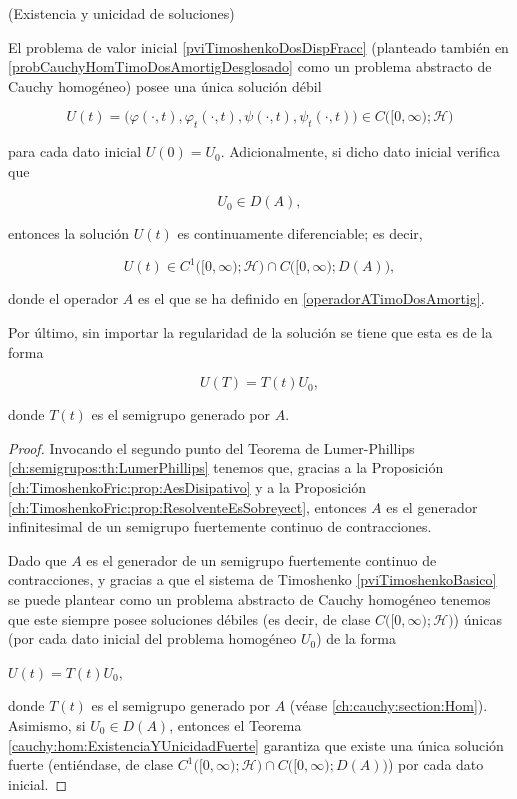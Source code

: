 \begin{Teorema}{(Existencia y unicidad de soluciones)}
    \label{ch:TimoshenkoFric:prop:existenciaYUnicidad}
    
    El problema de valor inicial \eqref{pviTimoshenkoDosDispFracc} (planteado también en \eqref{probCauchyHomTimoDosAmortigDesglosado} como un problema abstracto de Cauchy homogéneo) posee una única solución débil

    \[U(t) = \big(\varphi(\cdot, t), \varphi_t(\cdot, t), \psi(\cdot, t), \psi_t(\cdot, t)\big) \in C\big([0,\infty);\mathcal{H}\big)\]

    para cada dato inicial $U(0) = U_0$. Adicionalmente, si dicho dato inicial verifica que

    \[U_0 \in D(A),\]

    entonces la solución $U(t)$ es continuamente diferenciable; es decir,

    \[U(t) \in C^1\big([0,\infty);\mathcal{H}\big) \cap C\big([0,\infty) ; D(A)\big),\]

    donde el operador $A$ es el que se ha definido en \eqref{operadorATimoDosAmortig}. 
    
    Por último, sin importar la regularidad de la solución se tiene que esta es de la forma

    \[U(T) = T(t)U_0,\]

    donde $T(t)$ es el semigrupo generado por $A$.
\end{Teorema}

\begin{proof}
    Invocando el segundo punto del Teorema de Lumer-Phillips \eqref{ch:semigrupos:th:LumerPhillips} tenemos que, gracias a la Proposición \eqref{ch:TimoshenkoFric:prop:AesDisipativo} y a la Proposición \eqref{ch:TimoshenkoFric:prop:ResolventeEsSobreyect}, entonces $A$ es el generador infinitesimal de un semigrupo fuertemente continuo de contracciones.

    Dado que $A$ es el generador de un semigrupo fuertemente continuo de contracciones, y gracias a que el sistema de Timoshenko \eqref{pviTimoshenkoBasico} se puede plantear como un problema abstracto de Cauchy homogéneo tenemos que este siempre posee soluciones débiles (es decir, de clase $C\big([0,\infty);\mathcal{H}\big)$) únicas (por cada dato inicial del problema homogéneo $U_0$) de la forma 

    $U(t) = T(t)U_0,$

    donde $T(t)$ es el semigrupo generado por $A$ (véase \ref{ch:cauchy:section:Hom}). Asimismo, si $U_0 \in D(A)$, entonces el Teorema \eqref{cauchy:hom:ExistenciaYUnicidadFuerte} garantiza que existe una única solución fuerte (entiéndase, de clase $C^1\big([0,\infty);\mathcal{H}\big) \cap C\big([0,\infty) ; D(A)\big)$) por cada dato inicial. 
\end{proof}

